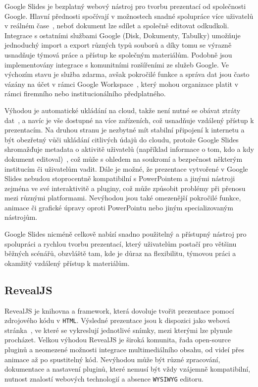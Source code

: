 Google Slides je bezplatný webový nástroj pro tvorbu prezentací od společnosti Google. 
Hlavní přednosti spočívají v možnostech snadné spolupráce více uživatelů v reálném čase~\cite{slides}, neboť dokument lze sdílet a společně editovat odkudkoli.
Integrace s ostatními službami Google (Disk, Dokumenty, Tabulky) umožňuje jednoduchý import a export různých typů souborů a díky tomu se výrazně usnadňuje týmová práce a přístup ke společným materiálům. 
Podobně jsou implementovány integrace s komunitními rozšířeními ze služeb Google.
Ve výchozím stavu je služba zdarma, avšak pokročilé funkce a správa dat jsou často vázány na účet v rámci Google Workspace~\cite{slides}, který mohou organizace platit v rámci firemního nebo institucionálního předplatného. 

Výhodou je automatické ukládání na cloud, takže není nutné se obávat ztráty dat~\cite{slides}, a navíc je vše dostupné na více zařízeních, což usnadňuje vzdálený přístup k prezentacím. 
Na druhou stranu je nezbytné mít stabilní připojení k internetu a být obezřetný vůči ukládání citlivých údajů do cloudu, protože Google Slides shromažďuje metadata o aktivitě uživatelů (například informace o tom, kdo a kdy dokument editoval)~\cite{google_terms}, což může s ohledem na soukromí a bezpečnost některým institucím či uživatelům vadit. 
Dále je možné, že prezentace vytvořené v Google Slides nebudou stoprocentně kompatibilní s PowerPointem a jinými nástroji zejména ve své interaktivitě a pluginy, což může způsobit problémy při přenosu mezi různými platformami. 
Nevýhodou jsou také omezenější pokročilé funkce, animace či grafické úpravy oproti PowerPointu nebo jiným specializovaným nástrojům. 

Google Slides nicméně celkově nabízí snadno použitelný a přístupný nástroj pro spolupráci a rychlou tvorbu prezentací, který uživatelům postačí pro většinu běžných scénářů, obzvláště tam, kde je důraz na flexibilitu, týmovou práci a okamžitý vzdálený přístup k materiálům.


\subsection{RevealJS}\label{text:revealjs}

RevealJS je knihovna a framework, která dovoluje tvořit prezentace pomocí zdrojového kódu v \texttt{HTML}. 
Výsledné prezentace jsou k dispozici jako webová stránka~\cite{revealjs}, ve které se vykreslují jednotlivé snímky, mezi kterými lze plynule procházet. 
Velkou výhodou RevealJS je široká komunita, řada open-source pluginů a neomezené možnosti integrace multimediálního obsahu, od videí přes animace až po spustitelný kód. 
Nevýhodou může být různé zpracování, dokumentace a nastavení pluginů, které nemusí být vždy vzájemně kompatibilní, nutnost znalostí webových technologií a absence \texttt{WYSIWYG} editoru. 

